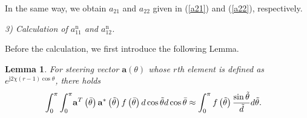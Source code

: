 \documentclass[12pt, draftclsnofoot, onecolumn]{IEEEtran}
\begin{document}
In the same way, we obtain $a_{21}$ and $a_{22}$ given in (\ref{a21}) and (\ref{a22}), respectively.

\emph{3) Calculation of $a_{11}^{\mathrm{n}}$ and $a_{12}^{\mathrm{n}}$.}

Before the calculation, we first introduce the following Lemma.
\newtheorem{lemma}{Lemma}
\begin{lemma}
For steering vector ${\mathbf{a}}\left( {\theta} \right)$ whose ${r}$th element is defined as ${{e}^{\text{j}2\chi\left( r-1 \right)\cos \theta }}$, there holds
\begin{align}
\int_{0}^{ \rm{\pi} }\int_{0}^{ \rm{\pi} } & { {{\mathbf{a}}^{T}}\left( {\bar{\theta }} \right) {{\mathbf{a}}^{*}}\left( {\tilde{\theta }} \right) f\left( {\bar{\theta }} \right)d\cos \tilde{\theta }}d\cos \bar{\theta }
 \approx \int_{0}^{ \rm{\pi} }{f\left( {\tilde{\theta }} \right) \frac{\sin \tilde{\theta }}{\tilde{d}} d\tilde{\theta }}.
\end{align}
\end{lemma}
\end{document}
